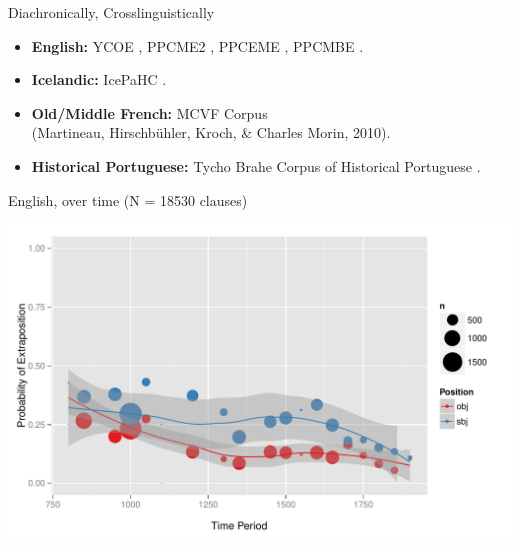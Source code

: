 \documentclass[hyperref={pdfpagelabels=false}]{beamer}
\begin{document}










\begin{frame}{Diachronically, Crosslinguistically}
\begin{itemize}
	\item \textbf{English:} YCOE \citep{ycoe}, PPCME2 \citep{ppcme2}, PPCEME \citep{ppceme}, PPCMBE \citep{ppcmbe}.
	\item \textbf{Icelandic:} IcePaHC \citep{icepahc09}.
	\item \textbf{Old/Middle French:} MCVF Corpus \\(Martineau, Hirschbühler, Kroch, \& Charles Morin, 2010)\nocite{mcvf}.
	\item \textbf{Historical Portuguese:} Tycho Brahe Corpus of Historical Portuguese \citep{tychobrahe}.
	\end{itemize}

\end{frame}

\begin{frame}{English, over time (N = 18530 clauses)}

\begin{center}

\includegraphics[width=1.1\textwidth]{exSbjObjYearBinned50Loessymeb.pdf}
\end{center}
\end{frame}
\end{document}
